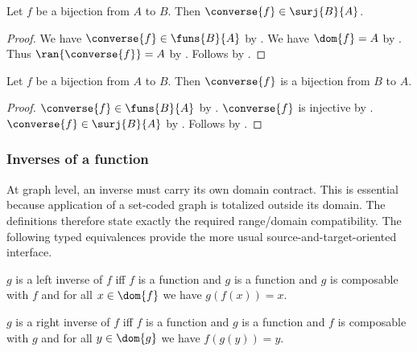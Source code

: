 \begin{proposition}\label{bijective_converse_are_surjs}
    Let $f$ be a bijection from $A$ to $B$.
    Then $\converse{f}\in\surj{B}{A}$.
\end{proposition}
\begin{proof}
    We have $\converse{f}\in\funs{B}{A}$ by .
    We have $\dom{f} = A$ by .
    Thus $\ran{\converse{f}} = A$ by .
    Follows by .
\end{proof}

\begin{proposition}\label{bijection_converse_is_bijection}
    Let $f$ be a bijection from $A$ to $B$.
    Then $\converse{f}$ is a bijection from $B$ to $A$.
\end{proposition}
\begin{proof}
    $\converse{f}\in\funs{B}{A}$ by .
    $\converse{f}$ is injective by .
    $\converse{f}\in\surj{B}{A}$ by .
    Follows by .
\end{proof}

\subsubsection{Inverses of a function}

At graph level, an inverse must carry its own domain contract.  This is
essential because application of a set-coded graph is totalized outside its
domain.  The definitions therefore state exactly the required range/domain
compatibility.  The following typed equivalences provide the more usual
source-and-target-oriented interface.

\begin{definition}\label{leftinverse}
    $g$ is a left inverse of $f$ iff
        $f$ is a function and $g$ is a function and
        $g$ is composable with $f$ and
        for all $x\in\dom{f}$ we have $g(f(x)) = x$.
\end{definition}

\begin{definition}\label{rightinverse}
    $g$ is a right inverse of $f$ iff
        $f$ is a function and $g$ is a function and
        $f$ is composable with $g$ and
        for all $y\in\dom{g}$ we have $f(g(y)) = y$.
\end{definition}

